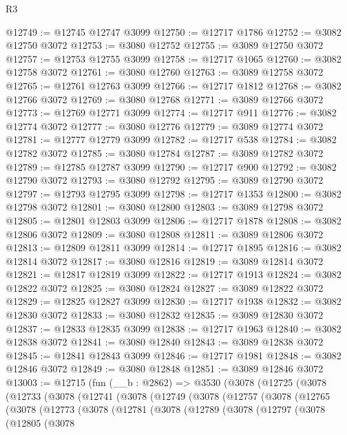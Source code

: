 \begin{lexlean}{R3}
\begin{coremodule}
@12749 := @12745 @12747 @3099
@12750 := @12717 @1786
@12752 := @3082 @12750 @3072
@12753 := @3080 @12752
@12755 := @3089 @12750 @3072
@12757 := @12753 @12755 @3099
@12758 := @12717 @1065
@12760 := @3082 @12758 @3072
@12761 := @3080 @12760
@12763 := @3089 @12758 @3072
@12765 := @12761 @12763 @3099
@12766 := @12717 @1812
@12768 := @3082 @12766 @3072
@12769 := @3080 @12768
@12771 := @3089 @12766 @3072
@12773 := @12769 @12771 @3099
@12774 := @12717 @911
@12776 := @3082 @12774 @3072
@12777 := @3080 @12776
@12779 := @3089 @12774 @3072
@12781 := @12777 @12779 @3099
@12782 := @12717 @538
@12784 := @3082 @12782 @3072
@12785 := @3080 @12784
@12787 := @3089 @12782 @3072
@12789 := @12785 @12787 @3099
@12790 := @12717 @900
@12792 := @3082 @12790 @3072
@12793 := @3080 @12792
@12795 := @3089 @12790 @3072
@12797 := @12793 @12795 @3099
@12798 := @12717 @1353
@12800 := @3082 @12798 @3072
@12801 := @3080 @12800
@12803 := @3089 @12798 @3072
@12805 := @12801 @12803 @3099
@12806 := @12717 @1878
@12808 := @3082 @12806 @3072
@12809 := @3080 @12808
@12811 := @3089 @12806 @3072
@12813 := @12809 @12811 @3099
@12814 := @12717 @1895
@12816 := @3082 @12814 @3072
@12817 := @3080 @12816
@12819 := @3089 @12814 @3072
@12821 := @12817 @12819 @3099
@12822 := @12717 @1913
@12824 := @3082 @12822 @3072
@12825 := @3080 @12824
@12827 := @3089 @12822 @3072
@12829 := @12825 @12827 @3099
@12830 := @12717 @1938
@12832 := @3082 @12830 @3072
@12833 := @3080 @12832
@12835 := @3089 @12830 @3072
@12837 := @12833 @12835 @3099
@12838 := @12717 @1963
@12840 := @3082 @12838 @3072
@12841 := @3080 @12840
@12843 := @3089 @12838 @3072
@12845 := @12841 @12843 @3099
@12846 := @12717 @1981
@12848 := @3082 @12846 @3072
@12849 := @3080 @12848
@12851 := @3089 @12846 @3072
@13003 := @12715
    (fun (__b : @2862) =>
    @3530
      (@3078
        (@12725
          (@3078
            (@12733
              (@3078
                (@12741
                  (@3078
                    (@12749
                      (@3078
                        (@12757
                          (@3078
                            (@12765
                              (@3078
                                (@12773
                                  (@3078
                                    (@12781
                                      (@3078
                                        (@12789
                                          (@3078
                                            (@12797
                                              (@3078
                                                (@12805
                                                  (@3078

\end{coremodule}
\end{lexlean}
